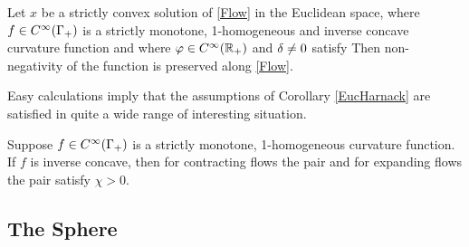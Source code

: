 \documentclass{amsart}
\begin{document}
\begin{corollary}\label{EucHarnack}
Let $x$ be a strictly convex solution of \eqref{Flow} in the Euclidean space, where $f\in C^{\infty}(\Gamma_+)$ is a strictly monotone, 1-homogeneous and inverse concave curvature function and where $\varphi\in C^{\infty}(\mathbb{R}_+)$ and $\delta\neq 0$ satisfy
Then non-negativity of the function
is preserved along \eqref{Flow}.
\end{corollary}


Easy calculations imply that the assumptions of Corollary \ref{EucHarnack} are satisfied in quite a wide range of interesting situation.

\begin{corollary}
Suppose $f\in C^{\infty}(\Gamma_+)$ is a strictly monotone, 1-homogeneous curvature function. If $f$ is inverse concave, then for contracting flows the pair
and for expanding flows the pair
satisfy $\chi>0$.
\end{corollary}

\subsection{The Sphere}
\end{document}
